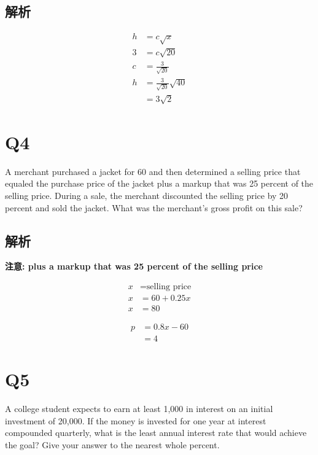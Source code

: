   \subsection{解析}

    \begin{align*}
      h &= c \sqrt{x} \\
      3 &= c \sqrt{20} \\
      c &= \frac{3}{\sqrt{20}} \\
      h &= \frac{3}{\sqrt{20}} \sqrt{40} \\
      &= 3 \sqrt{2}
    \end{align*}

\section{Q4}

  A merchant purchased a jacket for 60 and then determined a selling price
  that equaled the purchase price of the jacket plus a markup that was 25
  percent of the selling price. During a sale, the merchant discounted the
  selling price by 20 percent and sold the jacket. What was the merchant’s
  gross profit on this sale?

  \subsection{解析}

    \textbf{注意: plus a markup that was 25 percent of the selling price}

    \begin{align*}
      x &= \text{selling price} \\
      x &= 60 + 0.25 x \\
      x &= 80
    \end{align*}

    \begin{align*}
      p &= 0.8x - 60 \\
      &= 4
    \end{align*}

\section{Q5}

  A college student expects to earn at least 1,000 in interest on an initial
  investment of 20,000. If the money is invested for one year at interest
  compounded quarterly, what is the least annual interest rate that would
  achieve the goal? Give your answer to the nearest whole percent.

